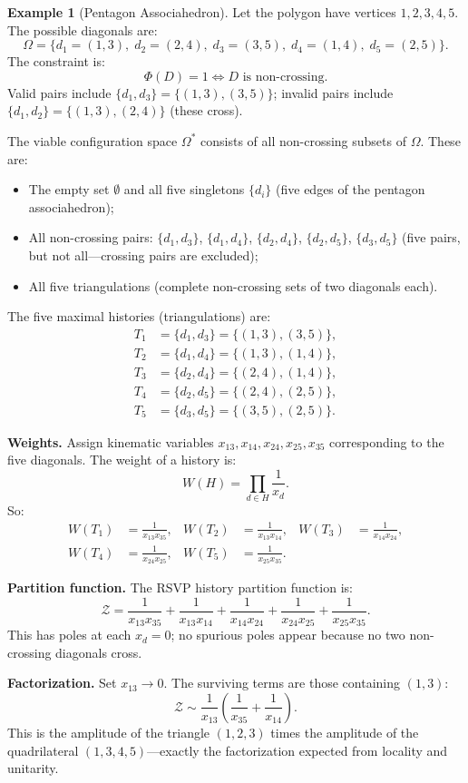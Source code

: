 \documentclass[12pt, oneside]{amsart}
\theoremstyle{plain}
\theoremstyle{definition}
\newtheorem{example}[theorem]{Example}
\theoremstyle{remark}
\newcommand{\Phif}{\Phi}   %
\newcommand{\OmKS}{\Omega}
\begin{document}
\begin{example}[Pentagon Associahedron]
Let the polygon have vertices $1, 2, 3, 4, 5$. The possible diagonals are:
\[
  \OmKS = \{d_1 = (1,3),\; d_2 = (2,4),\; d_3 = (3,5),\; d_4 = (1,4),\; d_5 = (2,5)\}.
\]
The constraint is:
\[
  \Phif(D) = 1 \iff D \text{ is non-crossing}.
\]
Valid pairs include $\{d_1, d_3\} = \{(1,3),(3,5)\}$; invalid pairs include $\{d_1, d_2\} = \{(1,3),(2,4)\}$ (these cross).

The viable configuration space $\OmKS^*$ consists of all non-crossing subsets of $\OmKS$. These are:
\begin{itemize}[noitemsep]
  \item The empty set $\emptyset$ and all five singletons $\{d_i\}$ (five edges of the pentagon associahedron);
  \item All non-crossing pairs: $\{d_1,d_3\}$, $\{d_1,d_4\}$, $\{d_2,d_4\}$, $\{d_2,d_5\}$, $\{d_3,d_5\}$ (five pairs, but not all---crossing pairs are excluded);
  \item All five triangulations (complete non-crossing sets of two diagonals each).
\end{itemize}

The five maximal histories (triangulations) are:
\begin{align*}
  T_1 &= \{d_1, d_3\} = \{(1,3),(3,5)\}, \\
  T_2 &= \{d_1, d_4\} = \{(1,3),(1,4)\}, \\
  T_3 &= \{d_2, d_4\} = \{(2,4),(1,4)\}, \\
  T_4 &= \{d_2, d_5\} = \{(2,4),(2,5)\}, \\
  T_5 &= \{d_3, d_5\} = \{(3,5),(2,5)\}.
\end{align*}

\textbf{Weights.} Assign kinematic variables $x_{13}, x_{14}, x_{24}, x_{25}, x_{35}$ corresponding to the five diagonals. The weight of a history is:
\[
  W(H) = \prod_{d \in H} \frac{1}{x_d}.
\]
So:
\begin{align*}
  W(T_1) &= \frac{1}{x_{13} x_{35}}, & W(T_2) &= \frac{1}{x_{13} x_{14}}, & W(T_3) &= \frac{1}{x_{14} x_{24}}, \\
  W(T_4) &= \frac{1}{x_{24} x_{25}}, & W(T_5) &= \frac{1}{x_{25} x_{35}}.
\end{align*}

\textbf{Partition function.} The RSVP history partition function is:
\begin{equation}
\label{eq:pentagon-Z}
  \mathcal{Z} = \frac{1}{x_{13}x_{35}} + \frac{1}{x_{13}x_{14}} + \frac{1}{x_{14}x_{24}} + \frac{1}{x_{24}x_{25}} + \frac{1}{x_{25}x_{35}}.
\end{equation}
This has poles at each $x_d = 0$; no spurious poles appear because no two non-crossing diagonals cross.

\textbf{Factorization.} Set $x_{13} \to 0$. The surviving terms are those containing $(1,3)$:
\[
  \mathcal{Z} \sim \frac{1}{x_{13}} \left(\frac{1}{x_{35}} + \frac{1}{x_{14}}\right).
\]
This is the amplitude of the triangle $(1,2,3)$ times the amplitude of the quadrilateral $(1,3,4,5)$---exactly the factorization expected from locality and unitarity.
\end{example}
\end{document}

